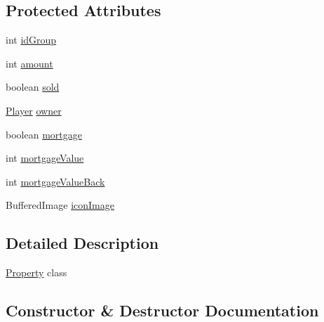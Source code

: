 \subsection*{Protected Attributes}
\begin{DoxyCompactItemize}
\item 
int \hyperlink{class_monopoly_1_1_logic_1_1_property_ab42a31cd99e909728aa49c0184f644b8}{id\+Group}
\item 
int \hyperlink{class_monopoly_1_1_logic_1_1_property_a3e5525c94c56e900372c5a13a8fe03fb}{amount}
\item 
boolean \hyperlink{class_monopoly_1_1_logic_1_1_property_a3a3b93ad91c78c5fc0ffd6f5bfbdad1b}{sold}
\item 
\hyperlink{class_monopoly_1_1_logic_1_1_player}{Player} \hyperlink{class_monopoly_1_1_logic_1_1_property_a9f3128c7bd27dcebe1b58227124e87ff}{owner}
\item 
boolean \hyperlink{class_monopoly_1_1_logic_1_1_property_acedac56746517571ae6b1a1f2664bae8}{mortgage}
\item 
int \hyperlink{class_monopoly_1_1_logic_1_1_property_ae4b874ede5de05f1f5b0ab329c2c58f5}{mortgage\+Value}
\item 
int \hyperlink{class_monopoly_1_1_logic_1_1_property_a55c335444620ceab613d4e89c81e1eff}{mortgage\+Value\+Back}
\item 
Buffered\+Image \hyperlink{class_monopoly_1_1_logic_1_1_property_ab0fae1c569e5e37a15d099364b86a6bf}{icon\+Image}
\end{DoxyCompactItemize}


\subsection{Detailed Description}
\hyperlink{class_monopoly_1_1_logic_1_1_property}{Property} class 

\subsection{Constructor \& Destructor Documentation}

